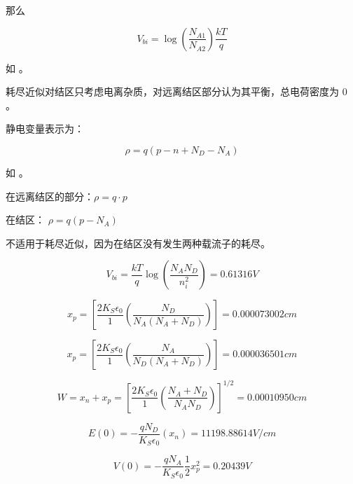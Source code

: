 \documentclass[lang=cn,11pt,a4paper,cite=authoryear]{elegantpaper}
\begin{document}
那么 

\[V_{bi} = \log(\frac{N_{A1}}{N_{A2}}) \frac{kT}{q}\]


如 。


耗尽近似对结区只考虑电离杂质，对远离结区部分认为其平衡，总电荷密度为 0 。


静电变量表示为： 

\[\rho =  q (p - n + N_D - N_A)\]


如 。

在远离结区的部分：\(\rho = q \cdot p\)

在结区： \(\rho = q (p - N_A)\)


不适用于耗尽近似，因为在结区没有发生两种载流子的耗尽。



\[V_{bi} = \frac{kT}{q} \log(\frac{N_A N_D}{n_i^2}) = 0.61316 V\] 


\[x_p = \left[\frac{2 K_S \epsilon_0}{1} \left(\frac{N_D}{N_A(N_A+N_D)}\right)\right] = 0.000073002 cm\]

\[x_p = \left[\frac{2 K_S \epsilon_0}{1} \left(\frac{N_A}{N_D(N_A+N_D)}\right)\right] = 0.000036501 cm\]

\[W = x_n + x_p = \left[\frac{2 K_S \epsilon_0}{1} \left(\frac{N_A + N_D}{N_AN_D}\right)\right]^{1/2} = 0.00010950 cm \]


\[E(0) = - \frac{q N_D}{K_S \epsilon_0} (x_n) = 11198.88614 V/cm \]

\[V(0) = - \frac{q N_A}{K_S \epsilon_0} \frac{1}{2} x_p^2 = 0.20439 V\]
\end{document}
